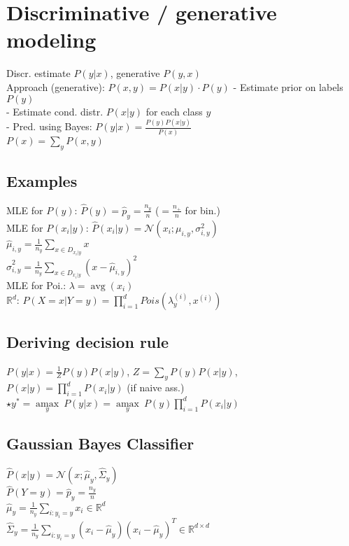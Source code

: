 \section*{Discriminative / generative modeling}
Discr. estimate $P(y|x)$, generative $P(y,x)$ \\
Approach (generative): $P(x,y) = P(x|y) \cdot P(y)$
- Estimate prior on labels $P(y)$\\
- Estimate cond. distr. $P(x|y)$ for each class $y$\\
- Pred. using Bayes:
$P(y|x) = \frac{P(y) P(x|y)}{P(x)}$\\
$P(x) = \sum_y P(x,y)$


\subsection*{Examples}
MLE for $P(y)$: $\hat{P}(y) = \hat{p}_y = \frac{n_y}{n}$ ($= \frac{n_+}{n}$ for bin.)\\
MLE for $P(x_i|y)$:
$\hat{P}(x_i|y)=\mathcal{N}(x_i;\mu_{i,y}, \sigma_{i,y}^2)$\\
$\hat{\mu}_{i,y} = \frac{1}{n_y} \sum_{x\in D_{x_i|y}} x$\\
$\hat{\sigma}_{i,y}^2 = \frac{1}{n_y} \sum_{x\in D_{x_i|y}}
(x-\hat{\mu}_{i,y})^2$\\
MLE for Poi.: $\lambda = \operatorname{avg}(x_i) $\\
$\mathbb{R}^d$: $P(X = x|Y = y) = \prod_{i=1}^dPois(\lambda_y^{(i)},x^{(i)})$


\subsection*{Deriving decision rule}
$P(y|x) = \frac{1}{Z} P(y)P(x|y)$, $Z = \sum_y P(y) P(x|y)$,\\ $P(x|y)=\prod^d_{i=1}P(x_i|y)$ (if naive ass.)\\
$\star y^* = \underset{y}{\operatorname{amax}} ~ P(y|x) = 
\underset{y}{\operatorname{amax}} ~ P(y) \prod_{i=1}^d P(x_i|y)$

\subsection*{Gaussian Bayes Classifier}
$\hat{P}(x|y) = \mathcal{N}(x ; \hat{\mu}_y, \hat{\Sigma}_y)$\\
$\hat{P}(Y=y) = \hat{p}_y = \frac{n_y}{n}$\\
$\hat{\mu}_{y} = \frac{1}{n_y} \sum_{i:y_i=y} x_i \in \mathbb{R}^d$\\
$\hat{\Sigma}_{y} = \frac{1}{n_y} \sum_{i:y_i=y} (x_i - \hat{\mu}_{y})(x_i-\hat{\mu}_y)^T \in \mathbb{R}^{d \times d}$

